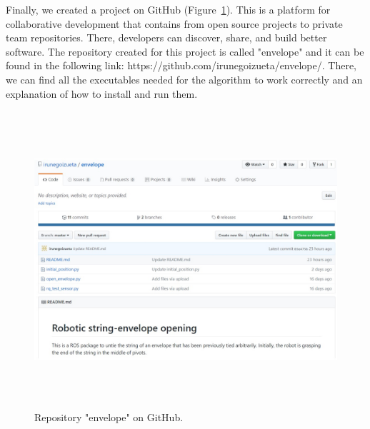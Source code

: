 Finally, we created a project on GitHub (Figure~\ref{fig:github}). This is a platform for collaborative development that contains from open source projects to private team repositories. There, developers can discover, share, and build better software. The repository created for this project is called "envelope" and it can be found in the following link: https://github.com/irunegoizueta/envelope/. There, we can find all the executables needed for the algorithm to work correctly and an explanation of how to install and run them.
\begin{figure}[htbp]
	\centering
	\includegraphics[height=110mm]{chapters/figures/conclusion/github.jpg}
	\caption{Repository "envelope" on GitHub.}
	\label{fig:github}
\end{figure}
